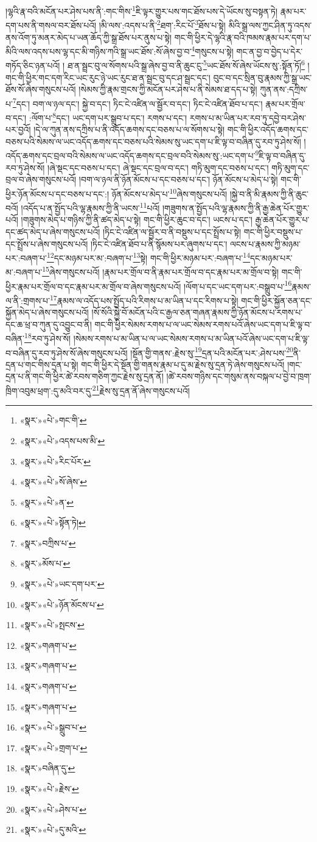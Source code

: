 །ལྷའི་རྣ་བའི་མངོན་པར་ཤེས་པས་ནི་:གང་གིས་\footnote{«སྣར་»«པེ་»གང་གི་}ཇི་ལྟར་གྱུར་པས་གང་ཐོས་པས་དེ་ཡོངས་སུ་བསྟན་ཏེ། རྣམ་པར་དག་པས་ནི་གསལ་བར་ཐོས་པའོ། །མི་ལས་:འདས་པ་ནི་\footnote{«སྣར་»«པེ་»འདས་པས་མི་}ཐག་:རིང་པོ་\footnote{«སྣར་»«པེ་»རིང་པོར་}ཐོས་པ་སྟེ། མིའི་སྒྲ་ལས་ཀྱང་ཤིན་ཏུ་འདས་ནས་འོག་ཏུ་མནར་མེད་པ་ཡན་ཆོད་ཀྱི་སྒྲ་ཐོས་པར་ནུས་པ་སྟེ། གང་གི་ཕྱིར་དེ་ལྷའི་རྣ་བའི་ཁམས་རྣམ་པར་དག་པ་མིའི་ལས་འདས་པས་ལྷ་དང་མི་གཉིས་ཀའི་སྒྲ་ཡང་ཐོས་:སོ་ཞེས་བྱ་བ་\footnote{«སྣར་»«པེ་»སོ་ཞེས་}གསུངས་པ་སྟེ། གང་ན་བྱ་བ་བྱེད་པ་དེར་གཏོད་ཅིང་ཉན་པའོ། །
ཐ་ན་སྦྲང་བུ་ལ་སོགས་པའི་སྒྲ་ཞེས་བྱ་བ་ནི་ཆུང་ངུ་\footnote{«སྣར་»«པེ་»ན་}ཡང་ཐོས་སོ་ཞེས་ཡོངས་སུ་:སྟོན་ཏོ།\footnote{«སྣར་»«པེ་»སྟོན་ཏེ།} །གང་གི་ཕྱིར་གང་དག་རིང་ཡང་རུང་ཉེ་ཡང་རུང་ཐ་ན་སྦྲང་བུ་དང་ཤ་སྦྲང་དང་། བུང་བ་དང་སྲིན་བུ་རྣམས་ཀྱི་སྒྲ་ཡང་ཐོས་སོ་ཞེས་གསུངས་པའོ། །སེམས་ཀྱི་རྣམ་གྲངས་ཀྱི་མངོན་པར་ཤེས་པ་ནི་སེམས་ཐ་དད་པ་སྟེ། ཀུན་ནས་:དཀྲིས་པ་\footnote{«སྣར་»བཀྲིས་པ་}དང་། བག་ལ་ཉལ་དང་། སྐྱེ་བ་དང་། ཏིང་ངེ་འཛིན་ལ་སྦྱོར་བ་དང་། ཏིང་ངེ་འཛིན་ཐོབ་པ་དང་། རྣམ་པར་གྲོལ་བ་དང་། :ལོག་པ་\footnote{«སྣར་»མོས་པ་}དང་། ཡང་དག་པར་སྒྲུབ་པ་དང་། རགས་པ་དང་། རགས་པ་མ་ཡིན་པར་རབ་ཏུ་དབྱེ་བར་ཤེས་པར་བྱའོ། །དེ་ལ་ཀུན་ནས་དཀྲིས་པ་ནི་འདོད་ཆགས་དང་བཅས་པ་ལ་སོགས་པ་སྟེ། གང་གི་ཕྱིར་འདོད་ཆགས་དང་བཅས་པའི་སེམས་ལ་ཡང་འདོད་ཆགས་དང་བཅས་པའི་སེམས་སུ་ཡང་དག་པ་ཇི་ལྟ་བ་བཞིན་དུ་རབ་ཏུ་ཤེས་སོ། །འདོད་ཆགས་དང་བྲལ་བའི་སེམས་ལ་ཡང་འདོད་ཆགས་དང་བྲལ་བའི་སེམས་སུ་:ཡང་དག་པ་\footnote{«སྣར་»«པེ་»ཡང་དག་པར་}ཇི་ལྟ་བ་བཞིན་དུ་རབ་ཏུ་ཤེས་སོ། །ཞེ་སྡང་དང་བཅས་པ་དང་། ཞེ་སྡང་དང་བྲལ་བ་དང་། གཏི་མུག་དང་བཅས་པ་དང་། གཏི་མུག་དང་བྲལ་བ་ཞེས་གསུངས་པའོ། །བག་ལ་ཉལ་ནི་ཉོན་མོངས་པ་དང་བཅས་པ་དང་། ཉོན་མོངས་པ་མེད་པ་སྟེ། གང་གི་ཕྱིར་ཉོན་མོངས་པ་དང་བཅས་པ་དང་:། ཉོན་མོངས་པ་མེད་པ་\footnote{«སྣར་»«པེ་»ཉོན་མོངས་པ་}ཞེས་གསུངས་པའོ། །སྐྱེ་བ་ནི་མི་རྣམས་ཀྱི་ནི་ཆུང་བའོ། །འདོད་པ་ན་སྤྱོད་པའི་ལྷ་རྣམས་ཀྱི་ནི་ཡངས་\footnote{«སྣར་»«པེ་»སྤངས་}པའོ། །གཟུགས་ན་སྤྱོད་པའི་ལྷ་རྣམས་ཀྱི་ནི་རྒྱ་ཆེན་པོར་གྱུར་པའོ། །གཟུགས་མེད་པ་གཉིས་ཀྱི་ནི་ཚད་མེད་པ་སྟེ། གང་གི་ཕྱིར་ཆུང་བ་དང་། ཡངས་པ་དང་། རྒྱ་ཆེན་པོར་གྱུར་པ་དང་ཚད་མེད་པ་ཞེས་གསུངས་པའོ། །ཏིང་ངེ་འཛིན་ལ་སྦྱོར་བ་ནི་བསྡུས་པ་དང་སྤྲོས་པ་སྟེ། གང་གི་ཕྱིར་བསྡུས་པ་དང་སྤྲོས་པ་ཞེས་གསུངས་པའོ། །ཏིང་ངེ་འཛིན་ཐོབ་པ་ནི་སྙོམས་པར་ཞུགས་པ་དང་། ལངས་པ་རྣམས་ཀྱི་མཉམ་པར་:བཞག་པ་\footnote{«སྣར་»གཞག་པ་}དང་མཉམ་པར་མ་:བཞག་པ་\footnote{«སྣར་»གཞག་པ་}སྟེ། གང་གི་ཕྱིར་མཉམ་པར་:བཞག་པ་\footnote{«སྣར་»གཞག་པ་}དང་མཉམ་པར་མ་:བཞག་པ་\footnote{«སྣར་»གཞག་པ་}ཞེས་གསུངས་པའོ། །རྣམ་པར་གྲོལ་བ་ནི་རྣམ་པར་གྲོལ་བ་དང་རྣམ་པར་མ་གྲོལ་བ་སྟེ། གང་གི་ཕྱིར་རྣམ་པར་གྲོལ་བ་དང་རྣམ་པར་མ་གྲོལ་བ་ཞེས་གསུངས་པའོ། །ལོག་པ་དང་ཡང་དག་པར་:བསྒྲུབ་པ་\footnote{«སྣར་»«པེ་»སྒྲུབ་པ་}རྣམས་ལ་ནི་:གྲགས་པ་\footnote{«སྣར་»«པེ་»གྲག་པ་}རྣམས་ལ་འདོད་པས་སྤྱོད་པའི་རིགས་པ་མ་ཡིན་པ་དང་རིགས་པ་སྟེ། གང་གི་ཕྱིར་སྐྱོན་ཅན་དང་སྐྱོན་མེད་པ་ཞེས་གསུངས་པའོ། །སོ་སོའི་སྐྱེ་བོ་མངོན་པའི་ང་རྒྱལ་ཅན་གཞན་རྣམས་ཀྱི་ཉོན་མོངས་པ་རགས་པ་དང་ཆ་ཕྲ་བ་ཀུན་དུ་འབྱུང་བ་ནི། གང་གི་ཕྱིར་སེམས་རགས་པ་ལ་ཡང་སེམས་རགས་པའོ་ཞེས་ཡང་དག་པ་ཇི་ལྟ་བ་བཞིན་\footnote{«སྣར་»བཞིན་དུ་}རབ་ཏུ་ཤེས་སོ། །སེམས་རགས་པ་མ་ཡིན་པ་ལ་ཡང་སེམས་རགས་པ་མ་ཡིན་པའོ་ཞེས་ཡང་དག་པ་ཇི་ལྟ་བ་བཞིན་དུ་རབ་ཏུ་ཤེས་སོ་ཞེས་གསུངས་པའོ། །སྔོན་གྱི་གནས་:རྗེས་སུ་\footnote{«སྣར་»«པེ་»རྗེས་}དྲན་པའི་མངོན་པར་:ཤེས་པས་\footnote{«སྣར་»«པེ་»ཤེས་པ་}ནི་དྲན་པ་གང་གིས་དྲན་པ་སྟེ། གང་གི་ཕྱིར་དེ་སྔོན་གྱི་གནས་རྣམ་པ་དུ་མ་རྗེས་སུ་དྲན་ཏེ་ཞེས་གསུངས་པའོ། །གང་དྲན་པ་ནི་གང་གི་ཕྱིར་ཚེ་རབས་གཅིག་ཀྱང་རྗེས་སུ་དྲན་ནོ། །ཚེ་རབས་གཉིས་དང་གསུམ་ནས་བསྐལ་པ་བྱེ་བ་ཁྲག་ཁྲིག་འབུམ་ཕྲག་:དུ་མའི་བར་དུ་\footnote{«སྣར་»«པེ་»དུ་མའི་}རྗེས་སུ་དྲན་ནོ་ཞེས་གསུངས་པའོ། 